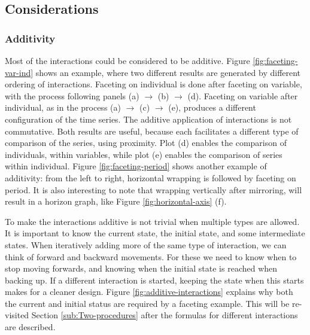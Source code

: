 \documentclass[12pt]{article}
\begin{document}
\subsection{Considerations}


\subsubsection{Additivity\label{sub:Additivity}}

Most of the interactions could be considered to be additive.
Figure \ref{fig:faceting-var-ind} shows an example, where two
different results are generated by different ordering of interactions.
Faceting on individual is done after faceting on variable, with the
process following panels (a) $\rightarrow$ (b) $\rightarrow$ (d).
Faceting on variable after individual, as in the process (a)
$\rightarrow$ (c) $\rightarrow$ (e), produces a different
configuration of the time series. The additive application of
interactions is not commutative. Both results are useful, because
each facilitates a different type of comparison of the series,
using proximity. Plot (d) enables the comparison of individuals,
within variables, while plot (e) enables the comparison of series
within individual. Figure \ref{fig:faceting-period} shows another
example of additivity: from the left to right, horizontal wrapping
is followed by faceting on period. It is also interesting to
note that wrapping vertically after mirroring, will result in
a horizon graph, like Figure \ref{fig:horizontal-axis} (f).

To make the interactions additive is not trivial when multiple types are allowed. It is important to know the current state, the initial state, and some intermediate states. When iteratively adding more of the same type of interaction, we can think of forward and backward movements. For these we need to know when to stop moving forwards, and knowing when the initial state is reached when backing up.  If a different interaction is started, keeping the state when this starts makes for a cleaner design.  Figure \ref{fig:additive-interactions} explains why both the current and initial status are required by a faceting example. This will be re-visited Section \ref{sub:Two-procedures} after the formulas for different interactions are described.
\end{document}
